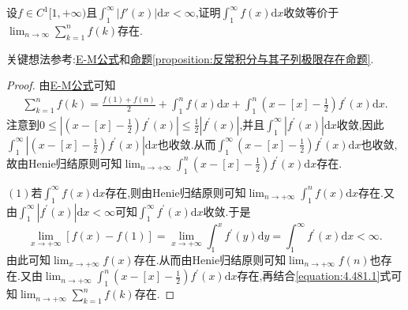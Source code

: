 \documentclass[../../main.tex]{subfiles}%
\begin{document}
\begin{example}
设\(f\in C^1[1,+\infty)\)且\(\int_{1}^{\infty}|f'(x)|\mathrm{d}x<\infty\),证明\(\int_{1}^{\infty}f(x)\mathrm{d}x\)收敛等价于\(\lim_{n\rightarrow\infty}\sum\limits_{k = 1}^{n}f(k)\)存在.
\end{example}
\begin{note}
关键想法参考:\hyperref[theorem:0阶Euler-Maclaurin公式(0阶E-M公式)]{E-M公式}和\hyperref[proposition:反常积分与其子列极限存在命题]{命题\ref{proposition:反常积分与其子列极限存在命题}}.
\end{note}
\begin{proof}
由\hyperref[theorem:0阶Euler-Maclaurin公式(0阶E-M公式)]{E-M公式}可知
\begin{align}\label{equation:4.481.1}
\sum\limits_{k = 1}^n f(k)=\frac{f(1) + f(n)}{2}+\int_1^n f(x)\mathrm{d}x+\int_1^n\left(x - [x] - \frac{1}{2}\right)f^\prime(x)\mathrm{d}x.
\end{align}
注意到\(0\leqslant\left|\left(x - [x] - \frac{1}{2}\right)f^\prime(x)\right|\leqslant\frac{1}{2}\left|f^\prime(x)\right|\),并且\(\int_1^{\infty}\left|f^\prime(x)\right|\mathrm{d}x\)收敛,因此\(\int_1^{\infty}\left|\left(x - [x] - \frac{1}{2}\right)f^\prime(x)\right|\mathrm{d}x\)也收敛.从而\(\int_1^{\infty}\left(x - [x] - \frac{1}{2}\right)f^\prime(x)\mathrm{d}x\)也收敛,故由Henie归结原则可知\(\lim_{n\rightarrow +\infty}\int_1^n\left(x - [x] - \frac{1}{2}\right)f^\prime(x)\mathrm{d}x\)存在.

\((1)\)若\(\int_1^{\infty}f(x)\mathrm{d}x\)存在,则由Henie归结原则可知\(\lim_{n\rightarrow +\infty}\int_1^n f(x)\mathrm{d}x\)存在.又由\(\int_1^{\infty}\left|f^\prime(x)\right|\mathrm{d}x < \infty\)可知\(\int_1^{\infty}f^\prime(x)\mathrm{d}x\)收敛.于是
\[
\lim_{x\rightarrow +\infty}[f(x) - f(1)]=\lim_{x\rightarrow +\infty}\int_1^x f^\prime(y)\mathrm{d}y=\int_1^{\infty}f^\prime(x)\mathrm{d}x < \infty.
\]
由此可知\(\lim_{x\rightarrow +\infty}f(x)\)存在.从而由Henie归结原则可知\(\lim_{n\rightarrow +\infty}f(n)\)也存在.又由\(\lim_{n\rightarrow +\infty}\int_1^n\left(x - [x] - \frac{1}{2}\right)f^\prime(x)\mathrm{d}x\)存在,再结合\eqref{equation:4.481.1}式可知\(\lim_{n\rightarrow +\infty}\sum\limits_{k = 1}^n f(k)\)存在.


\end{proof}
\end{document}
